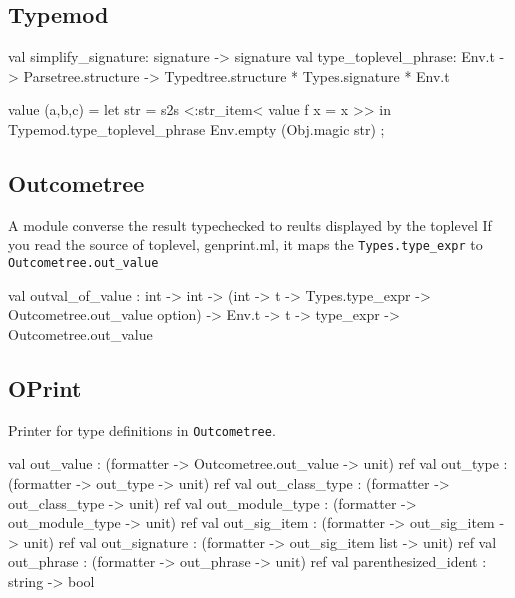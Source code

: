 \subsection{Typemod}

\begin{ocamlcode}
val simplify_signature: signature -> signature
val type_toplevel_phrase:
        Env.t -> Parsetree.structure ->
         Typedtree.structure * Types.signature * Env.t
\end{ocamlcode}

\begin{ocamlcode}
value (a,b,c) = 
  let str = s2s <:str_item< value f x = x  >> in
  Typemod.type_toplevel_phrase Env.empty (Obj.magic str) ;
\end{ocamlcode}



\subsection{Outcometree}
A module converse the result  typechecked to reults displayed by the toplevel
If you read the source of toplevel, genprint.ml, it maps the
\verb|Types.type_expr| to  \verb|Outcometree.out_value|
\begin{ocamlcode}
    val outval_of_value :
          int -> int ->
          (int -> t -> Types.type_expr -> Outcometree.out_value option) ->
          Env.t -> t -> type_expr -> Outcometree.out_value
\end{ocamlcode}


\subsection{OPrint}
Printer for type definitions in \verb|Outcometree|.

\begin{ocamlcode}
val out_value : (formatter -> Outcometree.out_value -> unit) ref
val out_type : (formatter -> out_type -> unit) ref
val out_class_type : (formatter -> out_class_type -> unit) ref
val out_module_type : (formatter -> out_module_type -> unit) ref
val out_sig_item : (formatter -> out_sig_item -> unit) ref
val out_signature : (formatter -> out_sig_item list -> unit) ref
val out_phrase : (formatter -> out_phrase -> unit) ref
val parenthesized_ident : string -> bool
\end{ocamlcode}
